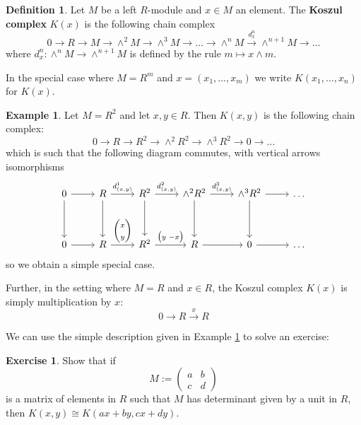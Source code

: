 \documentclass[12pt]{article}
\theoremstyle{plain}
\theoremstyle{definition}
\newtheorem{defn}[thm]{Definition} %
\newtheorem{exercise}[thm]{Exercise}
\newtheorem{example}[thm]{Example}
\newcommand{\lto}{\longrightarrow}
\begin{document}
%
\begin{defn}\label{def:koszul_complex}
	Let $M$ be a left $R$-module and $x \in M$ an element. The \textbf{Koszul complex} $K(x)$ is the following chain complex
	\begin{equation}
		0 \lto R \lto M \lto \wedge^2 M \lto \wedge^3 M \lto \hdots \lto \wedge^n M \stackrel{d_x^n}{\lto} \wedge^{n+1}M \lto \hdots
	\end{equation}
	where $d_x^n: \wedge^n M \lto \wedge^{n+1}M$ is defined by the rule $m \longmapsto x \wedge m$.
	
	In the special case where $M = R^m$ and $x = (x_1,...,x_m)$ we write $K(x_1,...,x_n)$ for $K(x)$.
\end{defn}
\begin{example}\label{ex:K(x,y)}
	Let $M = R^2$ and let $x,y \in R$. Then $K(x,y)$ is the following chain complex:
	\begin{equation}
		0 \lto R \lto R^2 \lto \wedge^2 R^2 \lto \wedge^3 R^2 \lto 0 \lto \hdots
	\end{equation}
	which is such that the following diagram commutes, with vertical arrows isomorphisms
	\begin{equation}
		\begin{tikzcd}[row sep = huge]
			0\arrow[r]\arrow[d] & R\arrow[r,"{d_{(x,y)}^1}"]\arrow[d] & R^2\arrow[r,"{d_{(x,y)}^2}"]\arrow[d] &\wedge^2 R^2\arrow[r,"{d_{(x,y)}^3}"]\arrow[d] & \wedge^3 R^2\arrow[d]\arrow[r] &  \hdots\\
			0\arrow[r] & R\arrow[r,"{\begin{pmatrix}
					x\\
					y
				\end{pmatrix}
			}"] & R^2\arrow[r,"{\begin{pmatrix}
					y \text{  } -x
				\end{pmatrix}
			}"]  & R\arrow[r] & 0\arrow[r] & \hdots
		\end{tikzcd}
	\end{equation}
	so we obtain a simple special case.
	
	Further, in the setting where $M = R$ and $x \in R$, the Koszul complex $K(x)$ is simply multiplication by $x$:
	\begin{equation}
		0 \lto R \stackrel{x}{\lto} R
	\end{equation}
\end{example}
We can use the simple description given in Example \ref{ex:K(x,y)} to solve an exercise:
\begin{exercise}
	Show that if
	\begin{equation}
		M := \begin{pmatrix}
			a & b\\
			c & d
		\end{pmatrix}
	\end{equation}
	is a matrix of elements in $R$ such that $M$ has determinant given by a unit in $R$, then $K(x,y) \cong K(ax + by, cx + dy)$.
\end{exercise}
\end{document}
